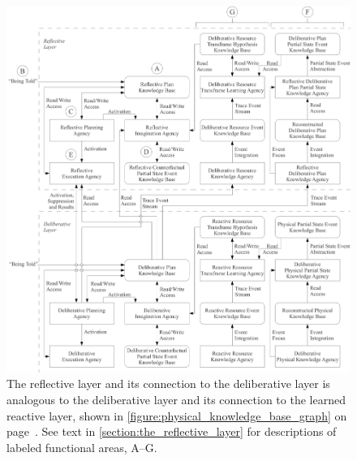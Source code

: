 \begin{figure}
\hspace{-3cm}\includegraphics[width=16cm]{gfx/reflective_and_deliberative_layers}
\caption[The reflective layer and its connection to the deliberative
  layer.]{The reflective layer and its connection to the deliberative
  layer is analogous to the deliberative layer and its connection to
  the learned reactive layer, shown in
  {\mbox{\autoref{figure:physical_knowledge_base_graph}}} on
  {\mbox{page~\pageref{figure:physical_knowledge_base_graph}}}.  See
  text in {\mbox{\autoref{section:the_reflective_layer}}} for
  descriptions of labeled functional areas, A--G.}
\label{figure:reflective_and_deliberative_layers}
\end{figure}

